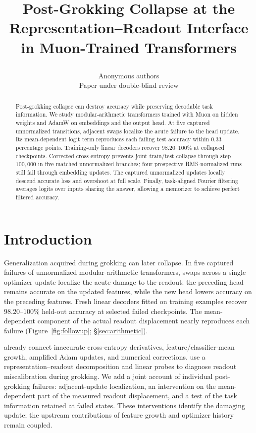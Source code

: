 \documentclass{article}
\title{\raggedright Post-Grokking Collapse at the Representation--Readout Interface\\ in Muon-Trained Transformers}
\author{Anonymous authors\\
Paper under double-blind review}
\begin{document}
\maketitle

\begin{abstract}
Post-grokking collapse can destroy accuracy while preserving decodable task information. We study modular-arithmetic transformers trained with Muon on hidden weights and AdamW on embeddings and the output head. At five captured unnormalized transitions, adjacent swaps localize the acute failure to the head update. Its mean-dependent logit term reproduces each failing test accuracy within $0.33$ percentage points. Training-only linear decoders recover $98.20$--$100\%$ at collapsed checkpoints. Corrected cross-entropy prevents joint train/test collapse through step $100{,}000$ in five matched unnormalized branches; four prospective RMS-normalized runs still fail through embedding updates. The captured unnormalized updates locally descend accurate loss and overshoot at full scale. Finally, task-aligned Fourier filtering averages logits over inputs sharing the answer, allowing a memorizer to achieve perfect filtered accuracy.
\end{abstract}

\section{Introduction}
\label{sec:intro}

Generalization acquired during grokking can later collapse. In five captured failures of unnormalized modular-arithmetic transformers, swaps across a single optimizer update localize the acute damage to the readout: the preceding head remains accurate on the updated features, while the new head lowers accuracy on the preceding features. Fresh linear decoders fitted on training examples recover $98.20$--$100\%$ held-out accuracy at selected failed checkpoints. The mean-dependent component of the actual readout displacement nearly reproduces each failure (Figure~\ref{fig:followup}; \S\ref{sec:arithmetic}).

\citet{liu2026glitching} already connect inaccurate cross-entropy derivatives, feature/classifier-mean growth, amplified Adam updates, and numerical corrections. \citet{chou2026twospeeds} use a representation--readout decomposition and linear probes to diagnose readout miscalibration during grokking. We add a joint account of individual post-grokking failures: adjacent-update localization, an intervention on the mean-dependent part of the measured readout displacement, and a test of the task information retained at failed states. These interventions identify the damaging update; the upstream contributions of feature growth and optimizer history remain coupled.
\end{document}
